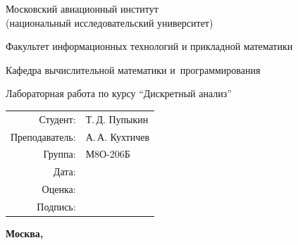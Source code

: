 \begin{titlepage}
\begin{center}
\bfseries

{\Large Московский авиационный институт\\ (национальный исследовательский университет)

}

\vspace{48pt}

{\large Факультет информационных технологий и прикладной математики
}

\vspace{36pt}

{\large Кафедра вычислительной математики и~программирования

}


\vspace{48pt}

Лабораторная работа  по курсу \enquote{Дискретный анализ}

\end{center}

\vspace{72pt}

\begin{flushright}
\begin{tabular}{rl}
Студент: & Т.\,Д. Пупыкин \\
Преподаватель: & А.\,А. Кухтичев \\
Группа: & М8О-206Б \\
Дата: & \\
Оценка: & \\
Подпись: & \\
\end{tabular}
\end{flushright}

\vfill

\begin{center}
\bfseries
Москва, \the\year
\end{center}
\end{titlepage}

\pagebreak